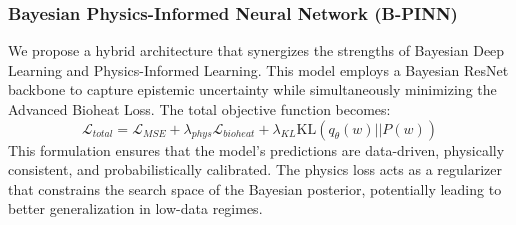 \subsubsection{Bayesian Physics-Informed Neural Network (B-PINN)}
We propose a hybrid architecture that synergizes the strengths of Bayesian Deep Learning and Physics-Informed Learning. This model employs a Bayesian ResNet backbone to capture epistemic uncertainty while simultaneously minimizing the Advanced Bioheat Loss. The total objective function becomes:
\begin{equation}
    \mathcal{L}_{total} = \mathcal{L}_{MSE} + \lambda_{phys} \mathcal{L}_{bioheat} + \lambda_{KL} \text{KL}(q_\theta(w) || P(w))
\end{equation}
This formulation ensures that the model's predictions are data-driven, physically consistent, and probabilistically calibrated. The physics loss acts as a regularizer that constrains the search space of the Bayesian posterior, potentially leading to better generalization in low-data regimes.
